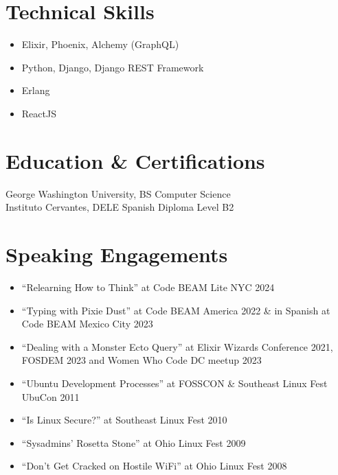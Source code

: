 \documentclass[headline, letterpaper]{res}
\begin{document}
\address{linkedin.com/in/mackenziemorgan, +1 (412) 298-0536\\maco@mackenzie.morgan.name\\GitHub: maco}
\begin{resume}
	\section{Technical Skills}
	\begin{itemize}
		\item Elixir, Phoenix, Alchemy (GraphQL)
		\item Python, Django, Django REST Framework
		\item Erlang
		\item ReactJS
	\end{itemize}

	




	\section{Education \& Certifications}
        George Washington University, BS Computer Science\\
		Instituto Cervantes, DELE Spanish Diploma Level B2
	\section{Speaking Engagements}
	\begin{itemize}
		    \item``Relearning How to Think'' at Code BEAM Lite NYC 2024
			\item``Typing with Pixie Dust'' at Code BEAM America 2022 \& in Spanish at Code BEAM Mexico City 2023
			\item``Dealing with a Monster Ecto Query'' at Elixir Wizards Conference 2021, FOSDEM 2023 and Women Who Code DC meetup 2023
			\item``Ubuntu Development Processes'' at FOSSCON \& Southeast Linux Fest UbuCon 2011
			\item``Is Linux Secure?'' at Southeast Linux Fest 2010
			\item``Sysadmins' Rosetta Stone'' at Ohio Linux Fest 2009%
			\item``Don't Get Cracked on Hostile WiFi'' at Ohio Linux Fest 2008
	\end{itemize}
\end{resume}
\end{document}
